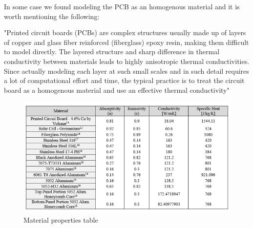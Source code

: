 \documentclass[final]{cubedoc}
\begin{document}
	
	
	
	
	In some case we found modeling the PCB as an homogenous material and it is worth mentioning the following:
	
	
	"Printed circuit boards (PCBs) are complex structures usually made up of layers of copper and glass fiber reinforced (fiberglass) epoxy resin, making them difficult to model directly. The layered structure and sharp difference in thermal conductivity between materials leads to highly anisotropic thermal conductivities. Since actually modeling each layer at such small scales and in such detail requires a lot of computational effort and time, the typical practice is to treat the circuit board as a homogenous material and use an effective thermal conductivity" \cite{peake2014cubesat}
	
	\begin{figure}[h!]
		\centering
		\includegraphics[keepaspectratio, height=0.3\textheight, width=\textwidth]{docs/material_properties_table.png}
		\caption{Material properties table  \cite[p.115]{zotero-47}}
		\label{fig:my_label}
	\end{figure}
	
\end{document}
